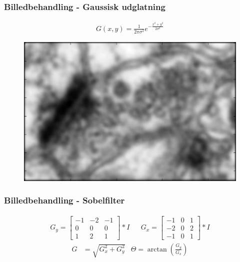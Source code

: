 \documentclass[12pt,t]{beamer}
\begin{document}
\begin{frame}
\frametitle{Billedbehandling - Gaussisk udglatning}
\begin{align*}
	G(x,y) = \frac{1}{2\pi\sigma^2}e^{-\frac{x^2+y^2}{2\sigma^2}}\label{ali:premethod_gaussG}
\end{align*}

\begin{figure}[H]
	\centering
	\includegraphics[scale=0.5]{../files/premethod/img/gausscell.png}
\end{figure}
\end{frame}

\begin{frame}
\frametitle{Billedbehandling - Sobelfilter}
\begin{align*}
	G_y = \begin{bmatrix}
		-1 & -2 & -1\\
		0 & 0 & 0\\
		1 & 2 & 1
	\end{bmatrix} * I
	&&
	G_x = \begin{bmatrix}
		-1 & 0 & 1\\
		-2 & 0 & 2\\
		-1 & 0 & 1
	\end{bmatrix} * I
	\end{align*}
\begin{align*}
	G &= \sqrt{G_x^2 + G_y^2}
	&\Theta = \arctan\left(\frac{G_y}{G_x}\right)
\end{align*}
\end{frame}
\end{document}
